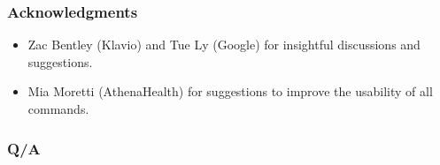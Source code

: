 \documentclass[bigger]{beamer}
\begin{document}
\begin{frame}
    \frametitle{Acknowledgments}
    \begin{itemize}
    \item Zac Bentley (Klavio) and Tue Ly (Google) for insightful
        discussions and suggestions.
    \item Mia Moretti (AthenaHealth) for suggestions to improve the
        usability of all commands.
    \end{itemize}
\end{frame}

\begin{frame}
    \frametitle{Q/A}
\end{frame}
\end{document}
